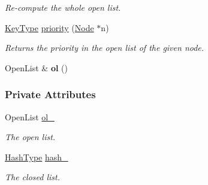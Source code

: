 \begin{DoxyCompactItemize}
\begin{DoxyCompactList}\small\item\em Re-\/compute the whole open list. \end{DoxyCompactList}\item 
\hyperlink{structslb_1_1core_1_1sb_1_1OpenClosedList_a9ffd5756297080af110c9d55b588a34e}{Key\+Type} \hyperlink{structslb_1_1core_1_1sb_1_1OpenClosedList_aa56f6d93b10b1acd3ee9e3a25e73f581}{priority} (\hyperlink{structslb_1_1core_1_1sb_1_1OpenClosedList_ab4cf0f882c69f162e0eccf4abe5ad27e}{Node} $\ast$n)
\begin{DoxyCompactList}\small\item\em Returns the priority in the open list of the given node. \end{DoxyCompactList}\item 
Open\+List \& {\bfseries ol} ()\hypertarget{structslb_1_1core_1_1sb_1_1OpenClosedList_a8be4837f70f9fbdbedc6b583cdd6d852}{}\label{structslb_1_1core_1_1sb_1_1OpenClosedList_a8be4837f70f9fbdbedc6b583cdd6d852}

\end{DoxyCompactItemize}
\subsubsection*{Private Attributes}
\begin{DoxyCompactItemize}
\item 
Open\+List \hyperlink{structslb_1_1core_1_1sb_1_1OpenClosedList_af0b03321ca539d207335869c317a35d0}{ol\+\_\+}\hypertarget{structslb_1_1core_1_1sb_1_1OpenClosedList_af0b03321ca539d207335869c317a35d0}{}\label{structslb_1_1core_1_1sb_1_1OpenClosedList_af0b03321ca539d207335869c317a35d0}

\begin{DoxyCompactList}\small\item\em The open list. \end{DoxyCompactList}\item 
\hyperlink{structslb_1_1core_1_1sb_1_1OpenClosedList_a32a2b03f9f64969e70977f9b5f858b3f}{Hash\+Type} \hyperlink{structslb_1_1core_1_1sb_1_1OpenClosedList_aa33f9bad7bafcad43a38e15581842cf4}{hash\+\_\+}\hypertarget{structslb_1_1core_1_1sb_1_1OpenClosedList_aa33f9bad7bafcad43a38e15581842cf4}{}\label{structslb_1_1core_1_1sb_1_1OpenClosedList_aa33f9bad7bafcad43a38e15581842cf4}

\begin{DoxyCompactList}\small\item\em The closed list. \end{DoxyCompactList}\end{DoxyCompactItemize}


